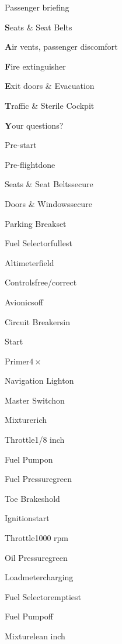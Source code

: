 




\begin{multicols}{2}
\begin{checklist}{Passenger briefing}
    \item{\textbf{S}eats \& Seat Belts}{}
    \item{\textbf{A}ir vents, passenger discomfort}{}
    \item{\textbf{F}ire extinguisher}{}
    \item{\textbf{E}xit doors \& Evacuation}{}
    \item{\textbf{T}raffic \& Sterile Cockpit}{}
    \item{\textbf{Y}our questions?}{}
\end{checklist}

\begin{checklist}{Pre-start}
    \item{Pre-flight}{done}
    \item{Seats \& Seat Belts}{secure}
    \item{Doors \& Windows}{secure}
    \item{Parking Break}{set}
    \item{Fuel Selector}{fullest}
    \item{Altimeter}{field}
    \item{Controls}{free/correct}
    \item{Avionics}{off}
    \item{Circuit Breakers}{in}
\end{checklist}

\begin{checklist}{Start}
    \item{Primer}{$4\times$}
    \item{Navigation Light}{on}
    \item{Master Switch}{on}
    \item{Mixture}{rich}
    \item{Throttle}{1/8 inch}
    \item{Fuel Pump}{on}
    \item{Fuel Pressure}{green}
    \item{Toe Brakes}{hold}
    \item{Ignition}{start}
    \item{Throttle}{1000 rpm}
    \item{Oil Pressure}{green}
    \item{Loadmeter}{charging}
    \item{Fuel Selector}{emptiest}
    \item{Fuel Pump}{off}
    \item{Mixture}{lean  inch}
\end{checklist}


\end{multicols}
